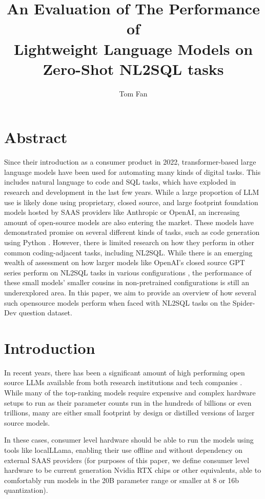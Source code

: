 \documentclass[sigconf]{acmart}
\title{An Evaluation of The Performance of \\
Lightweight Language Models on Zero-Shot NL2SQL tasks}
\author{Tom Fan}
\affiliation{
  \institution{Carleton University}
  \city{Ottawa}
  \country{Canada}
}
\begin{document}
\maketitle

\pagestyle{plain}


\section{Abstract}

Since their introduction as a consumer product in 2022, transformer-based large language models have been used for 
automating many kinds of digital tasks. This includes natural language to code and SQL tasks, which have exploded in 
research and development in the last few
years. While a large proportion of LLM use is likely done using proprietary, closed source, and large footprint 
foundation models hosted by SAAS providers like Anthropic or OpenAI, an increasing amount of open-source models are also 
entering the market. These models have demonstrated promise on several different kinds of tasks, such as code generation
using Python \cite{hasan2025smallcode}. However, there is limited research on how they perform in other common 
coding-adjacent tasks, including NL2SQL. While there is an emerging wealth of assessment on how larger models like OpenAI's
closed source GPT series perform on NL2SQL tasks in various configurations \cite{liu2024survey_nl2sql, nl2sqlsurvey},
the performance of these small models' smaller cousins in non-pretrained configurations is still an underexplored area.
In this paper, we aim to provide an overview of how several such opensource models perform when faced with  
NL2SQL tasks on the Spider-Dev question dataset.

\section{Introduction}

In recent years, there has been a significant amount of high performing open source LLMs available from both research 
institutions and tech companies \cite{llmstats2025}. While many of the top-ranking models require expensive and complex
hardware setups to run as their parameter counts run in the hundreds of billions or even trillions, many are either 
small footprint by design or distilled versions of larger source models. 

In these cases, consumer level hardware should be able to run the models using tools like localLLama, enabling their use
offline and without dependency on external SAAS providers (for purposes of this paper, we define consumer level hardware
to be current generation Nvidia RTX chips or other equivalents, able to comfortably run models in the 20B parameter range 
or smaller at 8 or 16b quantization). 
\end{document}
